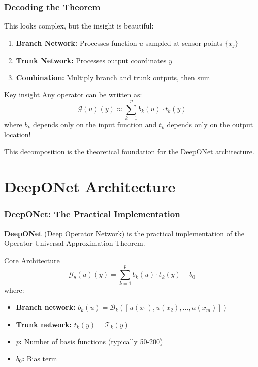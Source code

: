 \documentclass[notes]{beamer}
\begin{document}
\begin{frame}
\frametitle{Decoding the Theorem}

This looks complex, but the insight is beautiful:

\begin{enumerate}
    \item \textbf{Branch Network:} Processes function $u$ sampled at sensor points $\{x_j\}$
    \item \textbf{Trunk Network:} Processes output coordinates $y$
    \item \textbf{Combination:} Multiply branch and trunk outputs, then sum
\end{enumerate}

\begin{block}{Key insight}
Any operator can be written as:
\begin{equation*}
\mathcal{G}(u)(y) \approx \sum_{k=1}^p b_k(u) \cdot t_k(y)
\end{equation*}
where $b_k$ depends only on the input function and $t_k$ depends only on the output location!
\end{block}

This decomposition is the theoretical foundation for the DeepONet architecture.

\end{frame}

\section{DeepONet Architecture}

\begin{frame}
\frametitle{DeepONet: The Practical Implementation}

\textbf{DeepONet} (Deep Operator Network) is the practical implementation of the Operator Universal Approximation Theorem.

\begin{block}{Core Architecture}
\begin{equation*}
\mathcal{G}_\theta(u)(y) = \sum_{k=1}^p b_k(u) \cdot t_k(y) + b_0
\end{equation*}
where:
\begin{itemize}
    \item \textbf{Branch network:} $b_k(u) = \mathcal{B}_k([u(x_1), u(x_2), \ldots, u(x_m)])$
    \item \textbf{Trunk network:} $t_k(y) = \mathcal{T}_k(y)$
    \item \textbf{$p$:} Number of basis functions (typically 50-200)
    \item \textbf{$b_0$:} Bias term
\end{itemize}
\end{block}

\end{frame}
\end{document}
